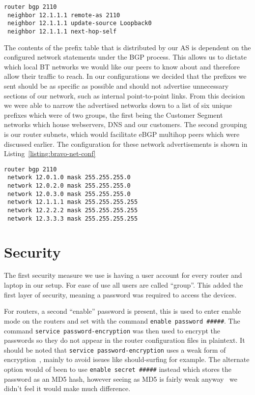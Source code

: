 \begin{lstlisting}[caption={Bravo-Alpha iBGP Configuration}, label={listing:bravo-ibgp-conf}]
router bgp 2110
 neighbor 12.1.1.1 remote-as 2110
 neighbor 12.1.1.1 update-source Loopback0
 neighbor 12.1.1.1 next-hop-self
\end{lstlisting}

The contents of the prefix table that is distributed by our AS is dependent on
the configured network statements under the BGP process. This allows us to
dictate which local BT networks we would like our peers to know about and
therefore allow their traffic to reach. In our configurations we decided that
the prefixes we sent should be as specific as possible and should not advertise
unnecessary sections of our network, such as internal point-to-point links. From
this decision we were able to narrow the advertised networks down to a list of
six unique prefixes which were of two groups, the first being the Customer
Segment networks which house webservers, DNS and our customers. The second
grouping is our router subnets, which would facilitate eBGP multihop peers which
were discussed earlier. The configuration for these network advertisements is
shown in Listing~\ref{listing:bravo-net-conf}

\begin{lstlisting}[caption={Bravo BGP Network Configuration}, label={listing:bravo-net-conf}]
router bgp 2110
 network 12.0.1.0 mask 255.255.255.0
 network 12.0.2.0 mask 255.255.255.0
 network 12.0.3.0 mask 255.255.255.0
 network 12.1.1.1 mask 255.255.255.255
 network 12.2.2.2 mask 255.255.255.255
 network 12.3.3.3 mask 255.255.255.255
\end{lstlisting}

\section{Security}
The first security measure we use is having a user account for every router and
laptop in our setup. For ease of use all users are called ``group''. This added
the first layer of security,  meaning a password was required to access the
devices.

For routers, a second ``enable'' password is present, this is used to enter
enable mode on the routers and set with the command \texttt{enable password
\#\#\#\#\#}. The command \texttt{service password-encryption} was then used to
encrypt the passwords so they do not appear in the router configuration files
in plaintext. It should be noted that \texttt{service password-encryption} uses
a weak form of encryption~\cite{ciscocracker}, mainly to avoid issues like
should-surfing for example. The alternate option would of been to use
\texttt{enable secret \#\#\#\#\#} instead which stores the password as an MD5
hash, however seeing as MD5 is fairly weak anyway~\cite{md5} we didn't feel it
would make much difference.

